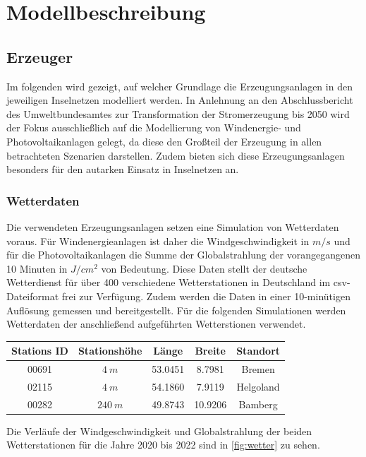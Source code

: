 \chapter{Modellbeschreibung}\label{Modellbeschreibung}
\section{Erzeuger}

Im folgenden wird gezeigt, auf welcher Grundlage die Erzeugungsanlagen in den jeweiligen Inselnetzen modelliert werden. In Anlehnung an den Abschlussbericht des Umweltbundesamtes zur Transformation der Stromerzeugung bis 2050 wird der Fokus ausschließlich auf die Modellierung von Windenergie- und Photovoltaikanlagen gelegt, da diese den Großteil der Erzeugung in allen betrachteten Szenarien darstellen. Zudem bieten sich diese Erzeugungsanlagen besonders für den autarken Einsatz in Inselnetzen an.

\subsection{Wetterdaten}

Die verwendeten Erzeugungsanlagen setzen eine Simulation von Wetterdaten voraus. Für Windenergieanlagen ist daher die Windgeschwindigkeit in $m/s$  und für die Photovoltaikanlagen die Summe der Globalstrahlung der vorangegangenen 10 Minuten in $J/cm^2$ von Bedeutung. Diese Daten stellt der deutsche Wetterdienst für über 400 verschiedene Wetterstationen in Deutschland im csv-Dateiformat frei zur Verfügung. Zudem werden die Daten in einer 10-minütigen Auflösung gemessen und bereitgestellt. Für die folgenden Simulationen werden Wetterdaten der anschließend aufgeführten Wetterstionen verwendet.

\begin{center}
	\begin{tabular}[htpb]{c|c|c|c|c}
		Stations ID & Stationshöhe & Länge & Breite & Standort \\
		\hline
		00691 & $4~m$ & 53.0451 & 8.7981 & Bremen \\
		02115 & $4~m$ & 54.1860 & 7.9119 & Helgoland \\
		00282 & $240~m$ & 49.8743 & 10.9206 & Bamberg 
	\end{tabular}
\end{center}

Die Verläufe der Windgeschwindigkeit und Globalstrahlung der beiden Wetterstationen für die Jahre 2020 bis 2022 sind in \autoref{fig:wetter} zu sehen.

